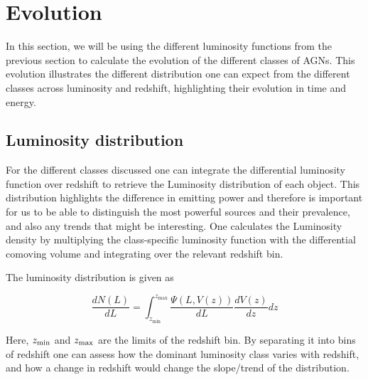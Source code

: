 \section{Evolution}
In this section, we will be using the different luminosity functions from the previous section to calculate the evolution of the different classes of AGNs. 
This evolution illustrates the different distribution one can expect from the different classes across luminosity and redshift, highlighting their evolution in time and energy.


 


\subsection{Luminosity distribution}
 
For the different classes discussed one can integrate the differential luminosity function over redshift to retrieve the Luminosity distribution of each 
object. This distribution highlights the difference in emitting power and therefore is important for us to be able to distinguish the most powerful 
sources and their prevalence, and also any trends that might be interesting. One calculates the Luminosity density by multiplying the class-specific luminosity
function with the differential comoving volume and integrating over the relevant redshift bin. 

The luminosity distribution is given as


\begin{equation}
    \frac{dN(L)}{dL} = \int_{z_{\text{min}}}^{z_{\text{max}}} \frac{\Psi(L, V(z))}{dL} \frac{dV(z)}{dz} dz
\end{equation}

Here, $z_{\rm min}$ and $z_{\rm max}$ are the limits of the redshift bin. By separating it into
bins of redshift one can assess how the dominant luminosity class varies with redshift, and how a change in redshift would change the slope/trend of the distribution.  

